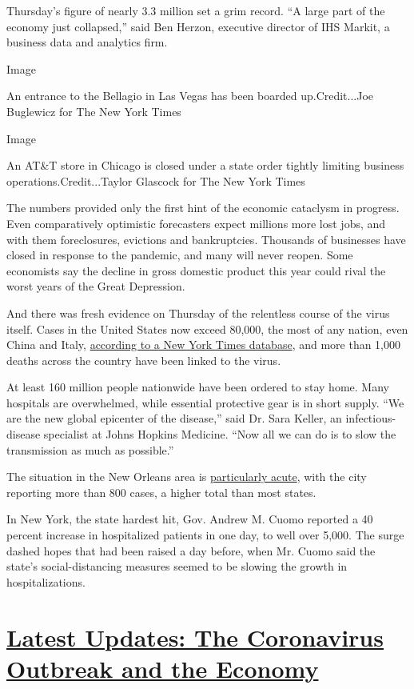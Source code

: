 Thursday's figure of nearly 3.3 million set a grim record. ``A large
part of the economy just collapsed,'' said Ben Herzon, executive
director of IHS Markit, a business data and analytics firm.

Image

An entrance to the Bellagio in Las Vegas has been boarded
up.Credit...Joe Buglewicz for The New York Times

Image

An AT\&T store in Chicago is closed under a state order tightly limiting
business operations.Credit...Taylor Glascock for The New York Times

The numbers provided only the first hint of the economic cataclysm in
progress. Even comparatively optimistic forecasters expect millions more
lost jobs, and with them foreclosures, evictions and bankruptcies.
Thousands of businesses have closed in response to the pandemic, and
many will never reopen. Some economists say the decline in gross
domestic product this year could rival the worst years of the Great
Depression.

And there was fresh evidence on Thursday of the relentless course of the
virus itself. Cases in the United States now exceed 80,000, the most of
any nation, even China and Italy,
\href{https://www.nytimes.com/interactive/2020/us/coronavirus-us-cases.html}{according
to a New York Times database}, and more than 1,000 deaths across the
country have been linked to the virus.

At least 160 million people nationwide have been ordered to stay home.
Many hospitals are overwhelmed, while essential protective gear is in
short supply. ``We are the new global epicenter of the disease,'' said
Dr. Sara Keller, an infectious-disease specialist at Johns Hopkins
Medicine. ``Now all we can do is to slow the transmission as much as
possible.''

The situation in the New Orleans area is
\href{https://www.nytimes.com/2020/03/26/us/coronavirus-louisiana-new-orleans.html}{particularly
acute}, with the city reporting more than 800 cases, a higher total than
most states.

In New York, the state hardest hit, Gov. Andrew M. Cuomo reported a 40
percent increase in hospitalized patients in one day, to well over
5,000. The surge dashed hopes that had been raised a day before, when
Mr. Cuomo said the state's social-distancing measures seemed to be
slowing the growth in hospitalizations.

\hypertarget{latest-updates-the-coronavirus-outbreak-and-the-economy}{%
\section{\texorpdfstring{\href{https://www.nytimes.com/live/2020/08/17/business/stock-market-today-coronavirus?action=click\&pgtype=Article\&state=default\&region=MAIN_CONTENT_1\&context=storylines_live_updates}{Latest
Updates: The Coronavirus Outbreak and the
Economy}}{Latest Updates: The Coronavirus Outbreak and the Economy}}\label{latest-updates-the-coronavirus-outbreak-and-the-economy}}

